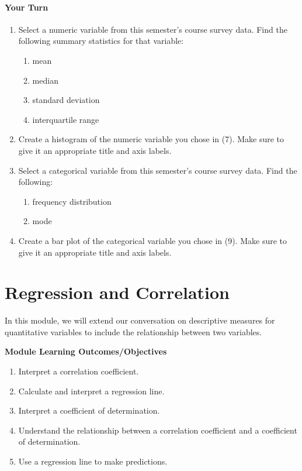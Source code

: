 \documentclass[
]{book}
\providecommand{\tightlist}{%
  \setlength{\itemsep}{0pt}\setlength{\parskip}{0pt}}
\begin{document}
\subsubsection*{Your Turn}\label{your-turn-10}

\begin{enumerate}
\def\labelenumi{\arabic{enumi}.}
\setcounter{enumi}{6}
\tightlist
\item
  Select a numeric variable from this semester's course survey data. Find the following summary statistics for that variable:

  \begin{enumerate}
  \def\labelenumii{\alph{enumii}.}
  \tightlist
  \item
    mean
  \item
    median
  \item
    standard deviation
  \item
    interquartile range
  \end{enumerate}
\item
  Create a histogram of the numeric variable you chose in (7). Make sure to give it an appropriate title and axis labels.
\item
  Select a categorical variable from this semester's course survey data. Find the following:

  \begin{enumerate}
  \def\labelenumii{\alph{enumii}.}
  \tightlist
  \item
    frequency distribution
  \item
    mode
  \end{enumerate}
\item
  Create a bar plot of the categorical variable you chose in (9). Make sure to give it an appropriate title and axis labels.
\end{enumerate}

\chapter{Regression and Correlation}\label{regression-and-correlation}

In this module, we will extend our conversation on descriptive measures
for quantitative variables to include the relationship between two
variables.

\textbf{Module Learning Outcomes/Objectives}

\begin{enumerate}
\def\labelenumi{\arabic{enumi}.}
\tightlist
\item
  Interpret a correlation coefficient.
\item
  Calculate and interpret a regression line.
\item
  Interpret a coefficient of determination.
\item
  Understand the relationship between a correlation coefficient and a
  coefficient of determination.
\item
  Use a regression line to make predictions.
\end{enumerate}
\end{document}
